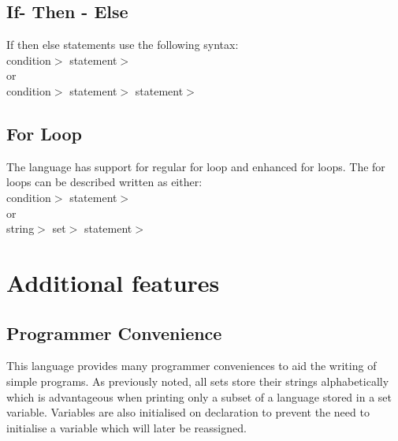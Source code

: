 \documentclass{article}
\begin{document}
\subsection{If- Then - Else}
If then else statements use the following syntax:\\
\IF {$<$}condition{$>$} \THEN {$<$}statement{$>$} \FI\\
or\\
\IF {$<$}condition{$>$} \THEN {$<$}statement{$>$} \ELSE {$<$}statement{$>$} \FI\\


\subsection{For Loop}
The language has support for regular for loop and enhanced for loops. The for 
loops can be described written as either:\\
\FOR {$<$}condition{$>$} \DO {$<$}statement{$>$} \ROF\\
or\\
\FOR {$<$}string{$>$} \IN {$<$}set{$>$} \DO {$<$}statement{$>$} \ROF\\


\section{Additional features}
\subsection{Programmer Convenience}
This language provides many programmer conveniences to aid the writing of 
simple programs. As previously noted, all sets store their strings 
alphabetically which is advantageous when printing only a subset of a language 
stored in a set variable. Variables are also initialised on declaration to 
prevent the need to initialise a variable which will later be reassigned. 
\end{document}
